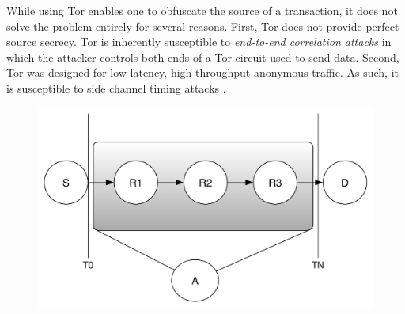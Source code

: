 While using Tor enables one to obfuscate the source of a transaction, it does not solve the problem entirely for several reasons. First, Tor does not provide perfect source secrecy. Tor is inherently susceptible to \emph{end-to-end correlation attacks} in which the attacker controls both ends of a Tor circuit used to send data. Second, Tor was designed for low-latency, high throughput anonymous traffic. As such, it is susceptible to side channel timing attacks \cite{bitcoin-tor-wiki}.

\begin{figure}
\begin{center}
\includegraphics[scale=0.40]{images/tor_attack.pdf}
\label{TODO.}
\label{fig:tor-end-to-end}
\end{center}
\end{figure}

